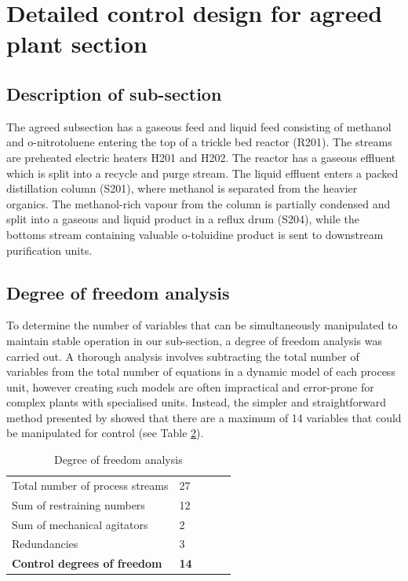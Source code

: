 \section{Detailed control design for agreed plant section}
\label{sec:subsec}

\subsection{Description of sub-section}
The agreed subsection has a gaseous  feed and liquid feed consisting of methanol and o-nitrotoluene entering the top of a trickle bed reactor (R201). The streams are preheated electric heaters H201 and H202. The reactor has a gaseous effluent which is split into a recycle and purge stream. The liquid effluent enters a packed distillation column (S201), where methanol is separated from the heavier organics. The methanol-rich vapour from the column is partially condensed and split into a gaseous and liquid product in a reflux drum (S204), while the bottoms stream containing valuable o-toluidine product is sent to downstream purification units.

\subsection{Degree of freedom analysis}
To determine the number of variables that can be simultaneously manipulated to maintain stable operation in our sub-section, a degree of freedom analysis was carried out. A thorough analysis involves subtracting the total number of variables from the total number of equations in a dynamic model of each process unit, however creating such models are often impractical and error-prone for complex plants with specialised units. Instead, the simpler and straightforward method presented by \textcite{} showed that there are a maximum of 14 variables that could be manipulated for control (see Table \ref{tab:dof}).

\begin{table}
\begin{table}[]
\centering
    \caption{Degree of freedom analysis}
    \label{tab:dof}
\begin{tabular}{@{}lllll@{}}
\toprule
Total number of process streams     & 27          &           &           &           \\
Sum of restraining numbers          & 12          &           &           &           \\
Sum of mechanical agitators         & 2           &           &           &           \\
Redundancies                        & 3           &           &           &           \\ \midrule
\textbf{Control degrees of freedom} & \textbf{14} & \textbf{} & \textbf{} & \textbf{} \\ \bottomrule
\end{tabular}
\end{table}
\end{table}


